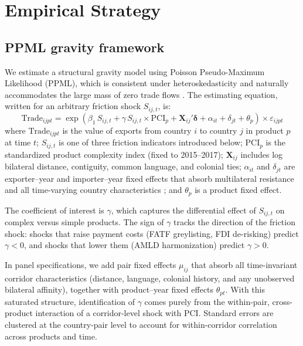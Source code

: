 \section{Empirical Strategy}
\label{sec:strategy}

\subsection{PPML gravity framework}

We estimate a structural gravity model using Poisson Pseudo-Maximum Likelihood (PPML), which is consistent under heteroskedasticity and naturally accommodates the large mass of zero trade flows \citep{SantosSilva2006_ppml}. The estimating equation, written for an arbitrary friction shock $S_{ij,t}$, is:
\begin{equation}
\text{Trade}_{ijpt} = \exp\left(\beta_1 \, S_{ij,t} + \gamma \, S_{ij,t} \times \text{PCI}_p + \mathbf{X}_{ij}' \boldsymbol{\delta} + \alpha_{it} + \delta_{jt} + \theta_p\right) \times \varepsilon_{ijpt}
\label{eq:gravity}
\end{equation}
where $\text{Trade}_{ijpt}$ is the value of exports from country $i$ to country $j$ in product $p$ at time $t$; $S_{ij,t}$ is one of three friction indicators introduced below; $\text{PCI}_p$ is the standardized product complexity index (fixed to 2015--2017); $\mathbf{X}_{ij}$ includes log bilateral distance, contiguity, common language, and colonial ties; $\alpha_{it}$ and $\delta_{jt}$ are exporter--year and importer--year fixed effects that absorb multilateral resistance and all time-varying country characteristics \citep{Anderson2003_gravity_gravitas}; and $\theta_p$ is a product fixed effect.

The coefficient of interest is $\gamma$, which captures the differential effect of $S_{ij,t}$ on complex versus simple products. The sign of $\gamma$ tracks the direction of the friction shock: shocks that raise payment costs (FATF greylisting, FDI de-risking) predict $\gamma < 0$, and shocks that lower them (AMLD harmonization) predict $\gamma > 0$.

In panel specifications, we add pair fixed effects $\mu_{ij}$ that absorb all time-invariant corridor characteristics (distance, language, colonial history, and any unobserved bilateral affinity), together with product--year fixed effects $\theta_{pt}$. With this saturated structure, identification of $\gamma$ comes purely from the within-pair, cross-product interaction of a corridor-level shock with PCI. Standard errors are clustered at the country-pair level to account for within-corridor correlation across products and time.

